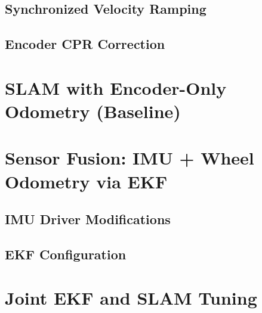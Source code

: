 \subsection{Synchronized Velocity Ramping}
\label{subsec:ramp_input_fix}

\subsection{Encoder CPR Correction}
\label{subsec:cpr_correction}

\section{SLAM with Encoder-Only Odometry (Baseline)}
\label{sec:slam_baseline}

\section{Sensor Fusion: IMU + Wheel Odometry via EKF}
\label{sec:ekf_fusion_hw}

\subsection{IMU Driver Modifications}
\label{subsec:imu_driver_mods}

\subsection{EKF Configuration}
\label{subsec:ekf_config_hw}

\section{Joint EKF and SLAM Tuning}
\label{sec:joint_ekf_slam_tuning}

